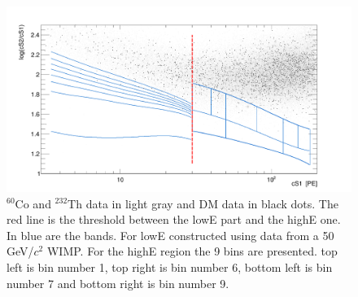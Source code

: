 \begin{table}

\caption{Bins definition. The estimated background event is calculated by taking the calibration sample and scaling it by $6.54\times10^{-3}$, which is a the ration between data and calibration in a sideband. The number of data events is the number of events from the DM data set in each bin.\textcolor{blue}{I changed this table as well a bit}} \label{table:BinDef}

\end{table}


\begin{figure}[h!]
\begin{minipage}{1.\linewidth}
\centerline{\includegraphics[width=1.\linewidth]{Figures/eft_sr.png}}
\end{minipage}
\caption{$^{60}\mathrm{Co}$ and $^{232}\mathrm{Th}$ data in light gray and DM data in black dots. The red line is the threshold between the lowE part and the highE one. In blue are the bands. For lowE constructed using data from a 50 GeV/$c^2$ WIMP. For the highE region the 9 bins are presented. top left is bin number 1,  top right is bin number 6, bottom left is bin number 7 and bottom right is bin number 9.}
\label{fig:phasespace}
\end{figure}  




